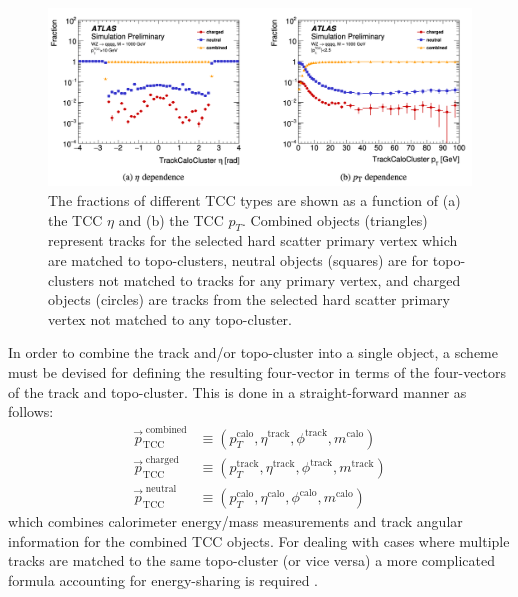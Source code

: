 \begin{figure}
	\centering
	\includegraphics[width=\textwidth]{tcc_cluster_fractions}
	\caption{
	The fractions of different TCC types are shown as a function  of (a) the TCC $\eta$ and (b) the TCC $p_T$.
	Combined objects (triangles) represent tracks for the selected hard scatter primary vertex which are matched to topo-clusters, neutral objects (squares) are for topo-clusters not matched to tracks for any primary vertex, and charged objects (circles) are tracks from the selected hard scatter primary vertex not matched to any topo-cluster.
    \cite{ATL-PHYS-PUB-2017-015}
	}
	\label{fig:tcc_cluster_fractions}
\end{figure}

In order to combine the track and/or topo-cluster into a single object, a scheme must be devised for defining the resulting four-vector in terms of the four-vectors of the track and topo-cluster.
This is done in a straight-forward manner as follows:
\newcommand*\caloP[1]{#1^{\mathrm{calo}}}
\newcommand*\trackP[1]{#1^{\mathrm{track}}}
\begin{align}
    \vec{p}_{\mathrm{TCC}}^{\mathrm{\;combined}} &\equiv (\caloP{p_T}, \trackP{\eta}, \trackP{\phi}, \caloP{m})\\
    \vec{p}_{\mathrm{TCC}}^{\mathrm{\;charged}} &\equiv (\trackP{p_T}, \trackP{\eta}, \trackP{\phi}, \trackP{m})\\
    \vec{p}_{\mathrm{TCC}}^{\mathrm{\;neutral}} &\equiv (\caloP{p_T}, \caloP{\eta}, \caloP{\phi}, \caloP{m})
\end{align}
which combines calorimeter energy/mass measurements and track angular information for the combined TCC objects.
For dealing with cases where multiple tracks are matched to the same topo-cluster (or vice versa) a more complicated formula accounting for energy-sharing is required \cite{ATL-PHYS-PUB-2017-015}. 

